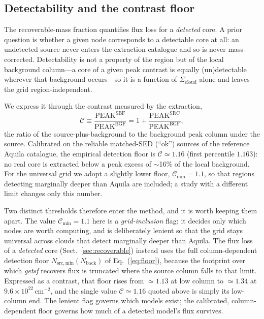 \documentclass[11pt,a4paper]{article}
\newcommand{\Scloud}{\Sigma_{\mathrm{cloud}}}
\begin{document}
\subsection{Detectability and the contrast floor}
\label{sec:detectability}

The recoverable-mass fraction quantifies flux loss for a \emph{detected} core.
A prior question is whether a given node corresponds to a detectable core at
all: an undetected source never enters the extraction catalogue and so is never
mass-corrected. Detectability is not a property of the region but of the local
background column---a core of a given peak contrast is equally (un)detectable
wherever that background occurs---so it is a function of $\Scloud$ alone and
leaves the grid region-independent.

We express it through the contrast measured by the extraction,
\begin{equation}
  \mathcal{C} \equiv \frac{\mathrm{PEAK^{SBF}}}{\mathrm{PEAK^{BGF}}}
             = 1 + \frac{\mathrm{PEAK^{SRC}}}{\mathrm{PEAK^{BGF}}},
  \label{eq:contrastdef}
\end{equation}
the ratio of the source-plus-background to the background peak column under the
source. Calibrated on the reliable matched-SED (``ok'') sources of the
reference Aquila catalogue, the empirical detection floor is
$\mathcal{C}\simeq1.16$ (first percentile $1.163$): no real core is extracted
below a peak excess of $\sim$16\% of the local background. For the universal
grid we adopt a slightly lower floor, $\mathcal{C}_{\min}=1.1$, so that regions
detecting marginally deeper than Aquila are included; a study with a different
limit changes only this number.

Two distinct thresholds therefore enter the method, and it is worth keeping
them apart. The value $\mathcal{C}_{\min}=1.1$ here is a \emph{grid-inclusion}
flag: it decides only which nodes are worth computing, and is deliberately
lenient so that the grid stays universal across clouds that detect marginally
deeper than Aquila. The flux loss of a \emph{detected} core
(Sect.~\ref{sec:recoverable}) instead uses the full column-dependent detection
floor $N_{\mathrm{src,min}}(N_{\mathrm{back}})$ of Eq.~(\ref{eq:floor}),
because the footprint over which \emph{getsf} recovers flux is truncated where
the source column falls to that limit. Expressed as a contrast, that floor
rises from $\simeq1.13$ at low column to $\simeq1.34$ at
$9.6\times10^{22}\,\mathrm{cm^{-2}}$, and the single value $\mathcal{C}\simeq1.16$
quoted above is simply its low-column end. The lenient flag governs which
models exist; the calibrated, column-dependent floor governs how much of a
detected model's flux survives.
\end{document}
